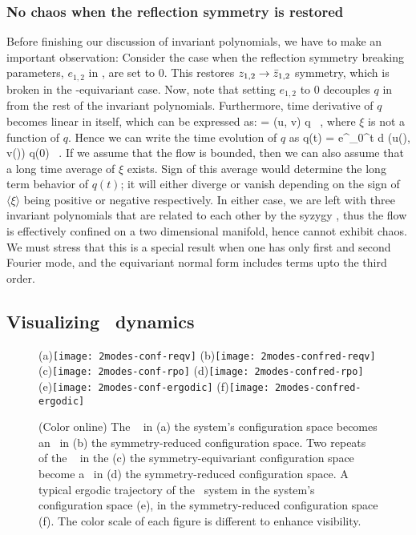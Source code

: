 \subsubsection{No chaos when the reflection symmetry is restored}
\label{s:dfsafs}

Before finishing our discussion of invariant polynomials, we have to make an
important observation: Consider the case when the reflection symmetry breaking
parameters, $e_{1,2}$ in , are set to $0$. This restores
$z_{1,2} \rightarrow \bar{z}_{1,2}$ symmetry, which is broken in
the -equivariant case. Now, note that setting $ e_{1,2} $ to $0$
decouples $q$ in  from the rest of the invariant polynomials.
Furthermore, time derivative of $q$ becomes linear in itself, which can be
expressed as:
\beq
     = \xi (u, v) q \, ,
where $\xi$ is not a function of $q$. Hence we can write
the time evolution of $q$ as
\beq
    q(t) =  e^{\int_0^t d \tau \xi (u(\tau), v(\tau))} q(0) \, .
If we assume that the flow is bounded, then we can also assume that a long time
average of $\xi$ exists. Sign of this average would determine the long term
behavior of $q(t)$; it will either diverge or vanish depending on the sign of
$\langle \xi \rangle$ being positive or negative respectively. In either case, we
are left with three invariant polynomials that are related to each other by the
syzygy , thus the flow is effectively confined on a two dimensional
manifold, hence cannot exhibit chaos. We must stress that this is a special result
when one has only first and second Fourier mode, and the equivariant normal form
includes terms upto the third order.

\subsection{Visualizing \twomode\ dynamics}
\label{s:visual}

\begin{figure*}%
\centering
(a)\!\!\texttt{[image: 2modes-conf-reqv]}%
(b)\!\!\texttt{[image: 2modes-confred-reqv]}%
(c)\!\!\texttt{[image: 2modes-conf-rpo]}%
(d)\!\!\texttt{[image: 2modes-confred-rpo]}%
(e)\!\!\texttt{[image: 2modes-conf-ergodic]}%
(f)\!\!\texttt{[image: 2modes-confred-ergodic]}%
\caption{(Color online)
The \reqv\ \REQV{}{} in
 (a) the system's configuration space becomes an \eqv\ in
 (b) the symmetry-reduced configuration space.
Two repeats of the \rpo\  in the
 (c) the symmetry-equivariant configuration space become a \po\ in
 (d) the symmetry-reduced configuration space.
A typical ergodic trajectory of the \twomode\ system
in the system's configuration space (e),
 in the symmetry-reduced configuration space (f).
The color scale of each figure is different to enhance visibility.
}
\label{fig:2modes-conf}
\end{figure*}

